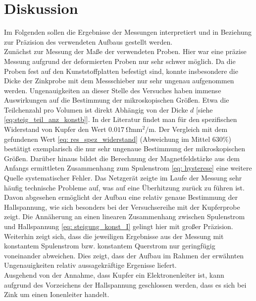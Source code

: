 \section{Diskussion}
Im Folgenden sollen die Ergebnisse der Messungen interpretiert und in Beziehung zur Präzision des verwendeten Aufbaus gestellt werden. \\
Zunächst zur Messung der Maße der verwendeten Proben. Hier war eine präzise Messung aufgrund der deformierten Proben nur sehr schwer möglich.
Da die Proben fest auf den Kunststoffplatten befestigt sind, konnte insbesondere die Dicke der Zinkprobe mit dem Messschieber nur sehr ungenau aufgenommen werden.
Ungenauigkeiten an dieser Stelle des Versuches haben immense Auswirkungen auf die Bestimmung der mikroskopischen Größen. Etwa die Teilchenzahl pro Volumen
ist direkt Abhängig von der Dicke $d$ [siehe \eqref{eq:steig_teil_anz_konstb}]. In der Literatur \cite{dem2} findet man für den spezifischen Widerstand von Kupfer den Wert $\SI{0.017}{\ohm \milli \meter^2 \per \meter}$. Der Vergleich %
mit dem gefundenen Wert \eqref{eq: res_spez_widerstand} (Abweichung im Mittel $630\%$) bestätigt exemplarisch die nur sehr ungenaue Bestimmung der mikroskopischen Größen.%
Darüber hinaus bildet die Berechnung der Magnetfeldstärke aus dem Anfangs ermittleten Zusammenhang zum Spulenstrom \eqref{eq: hysterese} eine weitere Quelle systematischer
Fehler. Das Netzgerät zeigte im Laufe der Messung sehr häufig technische Probleme auf, was auf eine Überhitzung zurück zu führen ist. \\
Davon abgesehen ermöglicht der Aufbau eine relativ genaue Bestimmung der Hallspannung, wie sich besonders bei der Versuchsereihe mit der Kupferprobe zeigt. Die Annäherung
an einen linearen Zusammenhang zwischen Spulenstrom und Hallspannung \eqref{eq: steigung_konst_I} gelingt hier mit großer Präzision. Weiterhin zeigt sich, dass die jeweiligen
Ergebnisse aus der Messung mit konstantem Spulenstrom bzw. konstantem Querstrom nur geringfügig voneinander abweichen. Dies zeigt, dass der Aufbau im Rahmen der erwähnten
Ungenauigkeiten relativ aussagekräftige Ergenisse liefert.\\
Ausgehend von der Annahme, dass Kupfer ein Elektronenleiter ist,
kann aufgrund des Vorzeichens der Hallspannung geschlossen werden, dass es sich bei Zink um einen Ionenleiter handelt. \\

